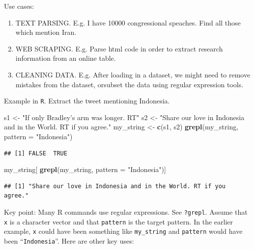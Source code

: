 \documentclass[]{book}
\newenvironment{Shaded}{\begin{snugshade}}{\end{snugshade}}
\newcommand{\DataTypeTok}[1]{\textcolor[rgb]{0.13,0.29,0.53}{#1}}
\newcommand{\KeywordTok}[1]{\textcolor[rgb]{0.13,0.29,0.53}{\textbf{#1}}}
\newcommand{\NormalTok}[1]{#1}
\newcommand{\StringTok}[1]{\textcolor[rgb]{0.31,0.60,0.02}{#1}}
\providecommand{\tightlist}{%
  \setlength{\itemsep}{0pt}\setlength{\parskip}{0pt}}
\theoremstyle{definition}
\theoremstyle{definition}
\theoremstyle{definition}
\theoremstyle{remark}
\begin{document}
Use cases:

\begin{enumerate}
\def\labelenumi{\arabic{enumi}.}
\tightlist
\item
  TEXT PARSING. E.g. I have 10000 congressional speaches. Find all those which mention Iran.
\item
  WEB SCRAPING. E.g. Parse html code in order to extract research information from an online table.
\item
  CLEANING DATA. E.g. After loading in a dataset, we might need to remove mistakes from the dataset, orsubset the data using regular expression tools.
\end{enumerate}

Example in \texttt{R}. Extract the tweet mentioning Indonesia.

\begin{Shaded}
\begin{Highlighting}[]
\NormalTok{s1 <-}\StringTok{ "If only Bradley's arm was longer. RT"}
\NormalTok{s2 <-}\StringTok{ "Share our love in Indonesia and in the World. RT if you agree."} 
\NormalTok{my_string <-}\StringTok{ }\KeywordTok{c}\NormalTok{(s1, s2)}
\KeywordTok{grepl}\NormalTok{(my_string, }\DataTypeTok{pattern =} \StringTok{"Indonesia"}\NormalTok{)}
\end{Highlighting}
\end{Shaded}

\begin{verbatim}
## [1] FALSE  TRUE
\end{verbatim}

\begin{Shaded}
\begin{Highlighting}[]
\NormalTok{my_string[ }\KeywordTok{grepl}\NormalTok{(my_string, }\DataTypeTok{pattern =} \StringTok{"Indonesia"}\NormalTok{)]}
\end{Highlighting}
\end{Shaded}

\begin{verbatim}
## [1] "Share our love in Indonesia and in the World. RT if you agree."
\end{verbatim}

Key point: Many R commands use regular expressions. See \texttt{?grepl}. Assume that \texttt{x} is a character vector and that \texttt{pattern} is the target pattern. In the earlier example, \texttt{x} could have been something like \texttt{my\_string} and \texttt{pattern} would have been ``\texttt{Indonesia}''. Here are other key uses:
\end{document}
